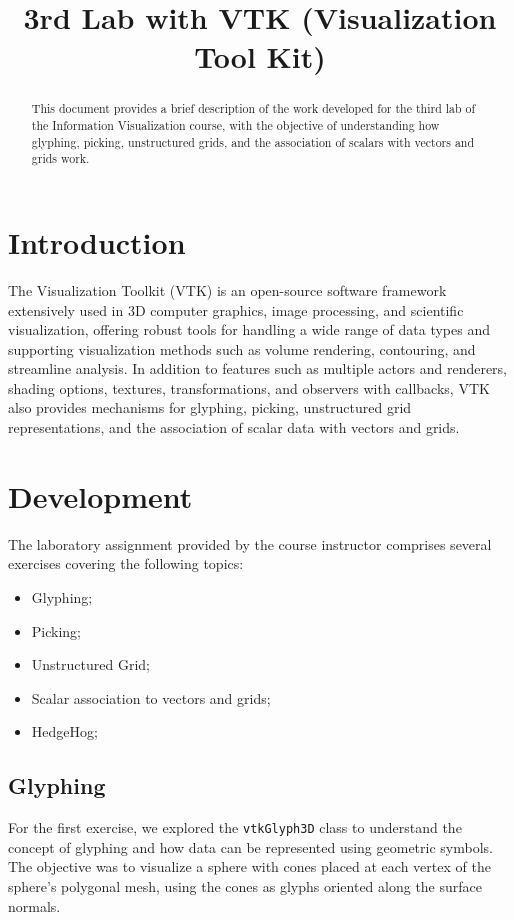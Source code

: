 \documentclass[10pt,conference]{IEEEtran}
\title{3rd Lab with VTK (Visualization Tool Kit)}
\author{
\IEEEauthorblockN{João Varela, 113780}
\IEEEauthorblockN{Carolina Prata, 114246}
\IEEEauthorblockA{Information Visualization, 2025\\
MSc in Computer Engineering, University of Aveiro}
}
\begin{document}
\maketitle

\begin{abstract}
This document provides a brief description of the work developed for the third lab of the Information Visualization course, with the objective of understanding how glyphing, picking, unstructured grids, and the association of scalars with vectors and grids work.
\end{abstract}

\section{Introduction}
The Visualization Toolkit (VTK) is an open-source software framework extensively used in 3D computer graphics, image processing, and scientific visualization, offering robust tools for handling a wide range of data types and supporting visualization methods such as volume rendering, contouring, and streamline analysis. In addition to features such as multiple actors and renderers, shading options, textures, transformations, and observers with callbacks, VTK also provides mechanisms for glyphing, picking, unstructured grid representations, and the association of scalar data with vectors and grids.

\section{Development}

The laboratory assignment provided by the course instructor comprises several exercises covering the following topics:

\begin{itemize}
    \item Glyphing;
    \item Picking;
    \item Unstructured Grid;
    \item Scalar association to vectors and grids;
    \item HedgeHog;
\end{itemize}


\subsection{Glyphing}
For the first exercise, we explored the \texttt{vtkGlyph3D} class to understand the concept of glyphing and how data can be represented using geometric symbols. The objective was to visualize a sphere with cones placed at each vertex of the sphere's polygonal mesh, using the cones as glyphs oriented along the surface normals.
\end{document}
